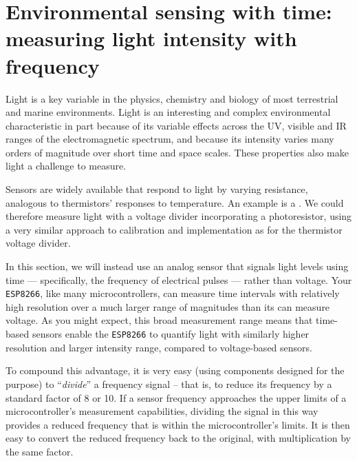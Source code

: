%


\section{Environmental sensing with time: measuring light intensity with frequency}
Light is a key variable in the physics, chemistry and biology of most terrestrial and marine environments. 
Light is an interesting and complex environmental characteristic in part because of its variable effects across the UV, visible and IR ranges of the electromagnetic spectrum, and because its intensity varies many orders of magnitude over short time and space scales.
These properties also make light a challenge to measure.

Sensors are widely available that respond to light by varying resistance, analogous to thermistors' responses to temperature.
An example is a .
We could therefore measure light with a voltage divider incorporating a photoresistor, using a very similar approach to calibration and implementation as for the thermistor voltage divider. 

In this section, we will instead use an analog sensor that signals light levels using time --- specifically, the frequency of electrical pulses --- rather than voltage. 
Your \texttt{ESP8266}, like many microcontrollers, can measure time intervals with relatively high resolution over a much larger range of magnitudes than its \adc can measure voltage. 
As you might expect, this broad measurement range means that time-based sensors enable the \texttt{ESP8266} to quantify light with similarly higher resolution and larger intensity range, compared to voltage-based sensors.

To compound this advantage, it is very easy (using components designed for the purpose) to ``\emph{divide}'' a frequency signal -- that is, to reduce its frequency by a standard factor of 8 or 10. 
If a sensor frequency approaches the upper limits of a microcontroller's measurement capabilities, dividing the signal in this way provides a reduced frequency that is within the microcontroller's limits. 
It is then easy to convert the reduced frequency back to the original, with multiplication by the same factor.

